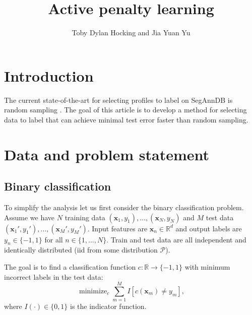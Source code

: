 \documentclass{article}
\newcommand{\RR}{\mathbb R}
\DeclareMathOperator*{\minimize}{minimize}
\begin{document}
\title{Active penalty learning}

\author{Toby Dylan Hocking and Jia Yuan Yu}

\maketitle

\section{Introduction}

The current state-of-the-art for selecting profiles to label on
SegAnnDB is random sampling \citep{HOCKING-SegAnnDB}. The goal of this article
is to develop a method for selecting data to label that can achieve
minimal test error faster than random sampling.

\section{Data and problem statement}

\subsection{Binary classification}

To simplify the analysis let us first consider the binary
classification problem. Assume we have $N$ training data $(\mathbf
x_1, y_1), \dots, (\mathbf x_N, y_N)$ and $M$ test data $(\mathbf
x_1', y_1'), \dots, (\mathbf x_M', y_M')$. Input features are $\mathbf
x_n\in\RR^d$ and output labels are $y_n\in\{-1, 1\}$ for all
$n\in\{1,\dots,N\}$. Train and test data are all independent and
identically distributed (iid from some distribution $\mathcal P$).

The goal is to find a classification function $c:\RR\rightarrow\{-1,
1\}$ with minimum incorrect labels in the test data:
\begin{equation}
  \label{eq:min_test_error}
  \minimize_c \sum_{m=1}^M
  I\left[
    c(\mathbf x_m) \neq y_m
  \right],
\end{equation}
where $I(\cdot)\in\{0,1\}$ is the indicator function.
\end{document}
